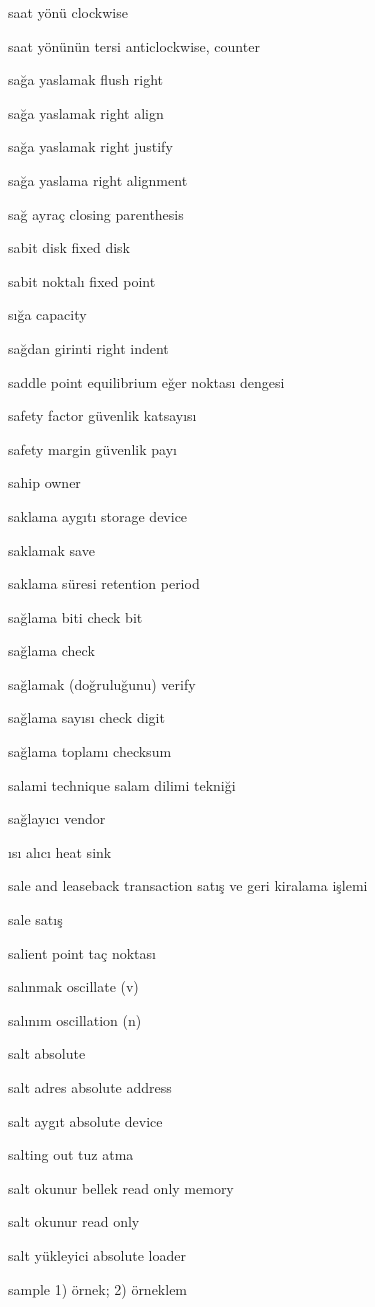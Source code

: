 \documentclass[12pt,fleqn]{article}\usepackage{../../common}
\begin{document}
saat yönü clockwise

saat yönünün tersi anticlockwise, counter

sağa yaslamak flush right

sağa yaslamak right align

sağa yaslamak right justify

sağa yaslama right alignment

sağ ayraç closing parenthesis

sabit disk fixed disk

sabit noktalı fixed point

sığa capacity

sağdan girinti right indent

saddle point equilibrium eğer noktası dengesi

safety factor güvenlik katsayısı

safety margin güvenlik payı

sahip owner

saklama aygıtı storage device

saklamak save

saklama süresi retention period

sağlama biti check bit

sağlama check

sağlamak (doğruluğunu) verify

sağlama sayısı check digit

sağlama toplamı checksum

salami technique salam dilimi tekniği

sağlayıcı vendor

ısı alıcı heat sink

sale and leaseback transaction satış ve geri kiralama işlemi

sale satış

salient point taç noktası

salınmak oscillate (v)

salınım oscillation (n)

salt absolute

salt adres absolute address

salt aygıt absolute device

salting out tuz atma

salt okunur bellek read only memory

salt okunur read only

salt yükleyici absolute loader

sample 1) örnek; 2) örneklem
\end{document}

